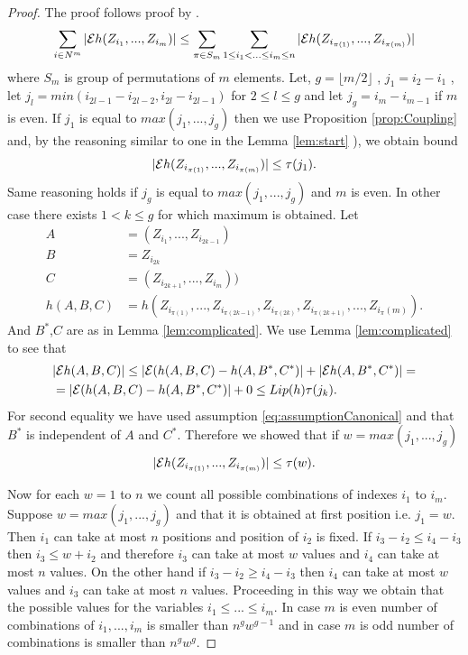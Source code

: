 \begin{proof}
 The proof follows proof by \cite[Lemma 3]{arcones1998law}. 
\begin{align}
 \sum_{i \in N^{m}} |\mathcal{E}   h(Z_{i_1},...,Z_{i_m})| \leq \sum_{\pi \in S_m} \sum_{1 \leq i_1< ...\leq i_m \leq n} |\mathcal{E}   h(Z_{i_{\pi(1)}},...,Z_{i_{\pi(m)}})|
\end{align}
where $S_m$ is group of permutations of $m$ elements.  Let, $g=\lfloor m/2 \rfloor$ , $j_1 = i_2 - i_1$ , let $j_l = min(i_{2l-1} - i_{2l-2} , i_{2l} - i_{2l-1} )$ for $2 \leq l \leq g$  and let $j_g = i_m - i_{m-1}$ if $m$ is even. If $j_1$ is equal to $max(j_1,...,j_g)$ then we use Proposition \ref{prop:Coupling} and, by the reasoning similar to one in the  Lemma \ref{lem:start} ), we obtain bound
 \begin{align}
  |\mathcal{E}   h(Z_{i_{\pi(1)}},...,Z_{i_{\pi(m)}})| \leq \tau(j_1). 
 \end{align}
Same reasoning holds if $j_g$ is equal to $max(j_1,...,j_g)$ and $m$ is even. In other case there exists $1 < k \leq g$ for which maximum is obtained. Let
\begin{align}
A &= (Z_{i_1},...,Z_{i_{2k-1}}) \\
B &= Z_{i_{2k}} \\
C &= (Z_{i_{2k+1}},...,Z_{i_m}) )\\
h(A,B,C) &= h(Z_{i_{\pi(1)}},...,Z_{i_{\pi(2k-1)}},Z_{i_{\pi(2k)}},Z_{i_{\pi(2k+1)}},...,Z_{i_\pi(m)}).
\end{align}
And $B^*$,$C$ are as in Lemma \ref{lem:complicated}. We use Lemma \ref{lem:complicated} to see that 
\begin{align}
&  |\mathcal{E}   h(A,B,C)| \leq | \mathcal{E} ( h(A,B,C) -  h(A,B^*,C^*)| +  |\mathcal{E} h(A,B^*,C^*)| = \\
&= | \mathcal{E} ( h(A,B,C) -  h(A,B^*,C^*)| + 0  \leq Lip(h)  \tau(j_k).
\end{align}
For second equality we have used assumption \ref{eq:assumptionCanonical} and that $B^*$ is independent of $A$ and $C^*$. Therefore we showed that if $w=max(j_1,...,j_g)$
\begin{align}
| \mathcal{E} h(Z_{i_{\pi(1)}},...,Z_{i_{\pi(m)}}) | \leq \tau(w).
\end{align}

Now for each $w=1$ to $n$ we count all possible combinations of indexes $i_1$ to $i_m$. Suppose $w=max(j_1,...,j_g)$ and that it is obtained at first position i.e. $j_1=w$. Then $i_1$ can take at most $n$ positions and position of $i_2$ is fixed. If $i_3-i_2 \leq i_4- i_3$ then $i_3 \leq w +i_2$ and therefore $i_3$ can take at most $w$ values and $i_4$ can take at most $n$ values. On the other hand if  $i_3-i_2 \geq i_4- i_3$ then $i_4$ can take at most $w$ values and $i_3$ can take at most $n$ values. Proceeding in this way we obtain that the possible values for the variables $i_1 \leq ... \leq i_m$. In case $m$ is even number of combinations of $i_1,...,i_m$ is smaller than $n^{g}w^{g-1}$ and in case $m$ is odd number of combinations is smaller than $n^g w^{g}$. 


\end{proof}
